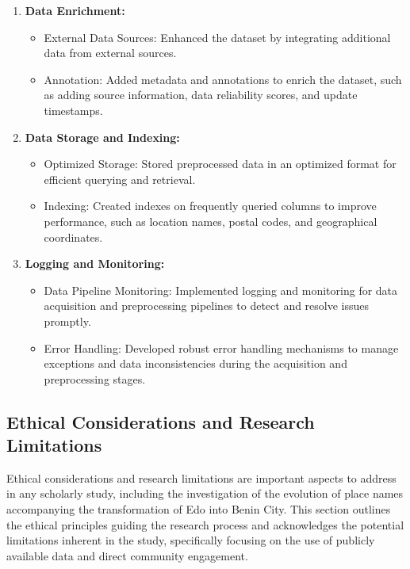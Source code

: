 \begin{enumerate}
    \item \textbf{Data Enrichment:}
    \begin{itemize}
        \item External Data Sources: Enhanced the dataset by integrating additional data from external sources.
        \item Annotation: Added metadata and annotations to enrich the dataset, such as adding source information, data reliability scores, and update timestamps.
    \end{itemize}
    
    \item \textbf{Data Storage and Indexing:}
    \begin{itemize}
        \item Optimized Storage: Stored preprocessed data in an optimized format for efficient querying and retrieval.
        \item Indexing: Created indexes on frequently queried columns to improve performance, such as location names, postal codes, and geographical coordinates.
    \end{itemize}
    
    \item \textbf{Logging and Monitoring:}
    \begin{itemize}
        \item Data Pipeline Monitoring: Implemented logging and monitoring for data acquisition and preprocessing pipelines to detect and resolve issues promptly.
        \item Error Handling: Developed robust error handling mechanisms to manage exceptions and data inconsistencies during the acquisition and preprocessing stages.
    \end{itemize}
\end{enumerate}

\subsection{Ethical Considerations and Research Limitations}

Ethical considerations and research limitations are important aspects to address in any scholarly study, including the investigation of the evolution of place names accompanying the transformation of Edo into Benin City. This section outlines the ethical principles guiding the research process and acknowledges the potential limitations inherent in the study, specifically focusing on the use of publicly available data and direct community engagement.

